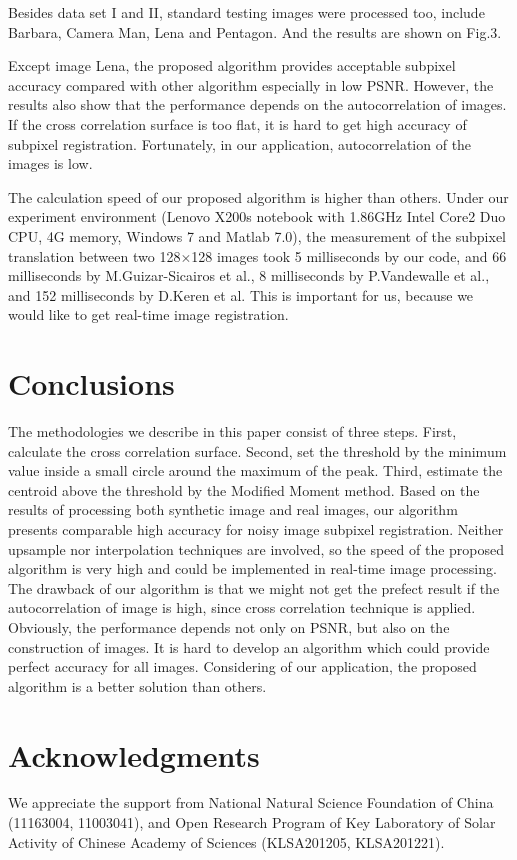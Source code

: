 \documentclass[conference]{IEEEtran}
\begin{document}
Besides data set I and II, standard testing images were processed too, include Barbara, Camera Man, Lena and Pentagon. And the results are shown on Fig.3.

Except image Lena, the proposed algorithm provides acceptable subpixel accuracy compared with other algorithm especially in low PSNR. However, the results also show that the performance depends on the autocorrelation of images. If the cross correlation surface is too flat, it is hard to get high accuracy of subpixel registration. Fortunately, in our application, autocorrelation of the images is low.

The calculation speed of our proposed algorithm is higher than others. Under our experiment environment (Lenovo X200s notebook with 1.86GHz Intel Core2 Duo CPU, 4G memory, Windows 7 and Matlab 7.0), the measurement of the subpixel translation between two 128$\times$128 images took 5 milliseconds by our code, and 66 milliseconds by M.Guizar-Sicairos et al., 8 milliseconds by P.Vandewalle et al., and 152 milliseconds by D.Keren et al. This is important for us, because we would like to get real-time image registration.

\section{Conclusions}
The methodologies we describe in this paper consist of three steps. First, calculate the cross correlation surface. Second, set the threshold by the minimum value inside a small circle around the maximum of the peak. Third, estimate the centroid above the threshold by the Modified Moment method. Based on the results of processing both synthetic image and real images, our algorithm presents comparable high accuracy for noisy image subpixel registration. Neither upsample nor interpolation techniques are involved, so the speed of the proposed algorithm is very high and could be implemented in real-time image processing. The drawback of our algorithm is that we might not get the prefect result if the autocorrelation of image is high, since cross correlation technique is applied. Obviously, the performance depends not only on PSNR, but also on the construction of images. It is hard to develop an algorithm which could provide perfect accuracy for all images. Considering of our application, the proposed algorithm is a better solution than others.

\section{Acknowledgments}
We appreciate the support from National Natural Science Foundation of China (11163004, 11003041), and Open Research Program of Key Laboratory of Solar Activity of Chinese Academy of Sciences (KLSA201205, KLSA201221).
\end{document}
